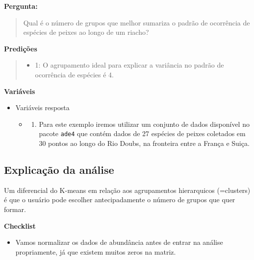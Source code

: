 \documentclass[
]{book}
\providecommand{\tightlist}{%
  \setlength{\itemsep}{0pt}\setlength{\parskip}{0pt}}
\begin{document}
\textbf{Pergunta:}

\begin{quote}
Qual é o número de grupos que melhor sumariza o padrão de ocorrência de espécies de peixes ao longo de um riacho?
\end{quote}

\textbf{Predições}

\begin{quote}
\begin{itemize}
\tightlist
\item
  1: O agrupamento ideal para explicar a variância no padrão de ocorrência de espécies é 4.
\end{itemize}
\end{quote}

\textbf{Variáveis}

\begin{itemize}
\tightlist
\item
  Variáveis resposta

  \begin{itemize}
  \item
    \begin{enumerate}
    \def\labelenumi{\arabic{enumi}.}
    \tightlist
    \item
      Para este exemplo iremos utilizar um conjunto de dados disponível no pacote \texttt{ade4} que contém dados de 27 espécies de peixes coletados em 30 pontos ao longo do Rio Doubs, na fronteira entre a França e Suiça.
    \end{enumerate}
  \end{itemize}
\end{itemize}

\hypertarget{explicauxe7uxe3o-da-anuxe1lise-1}{%
\subsection{Explicação da análise}\label{explicauxe7uxe3o-da-anuxe1lise-1}}

Um diferencial do K-means em relação aos agrupamentos hierarquicos (=clusters) é que o usuário pode escolher antecipadamente o número de grupos que quer formar.

\textbf{Checklist}

\begin{itemize}
\tightlist
\item
  Vamos normalizar os dados de abundância antes de entrar na análise propriamente, já que existem muitos zeros na matriz.
\end{itemize}
\end{document}
